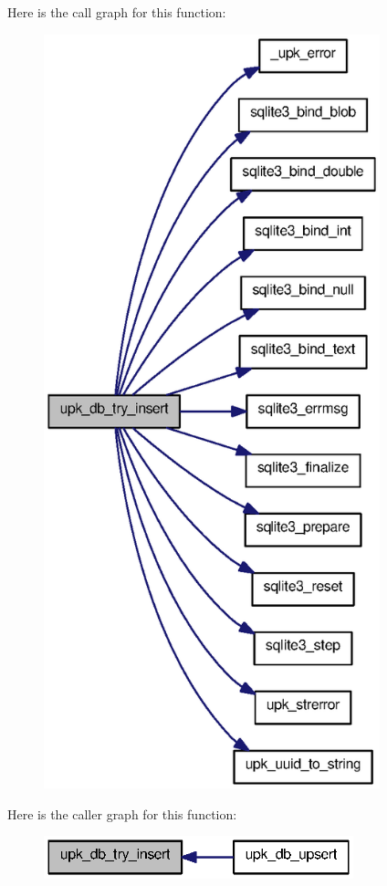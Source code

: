 Here is the call graph for this function:
\nopagebreak
\begin{figure}[H]
\begin{center}
\leavevmode
\includegraphics[width=276pt]{controller_2tp_8c_a134b3dca14e8ce64bc851612f8411458_cgraph}
\end{center}
\end{figure}




Here is the caller graph for this function:
\nopagebreak
\begin{figure}[H]
\begin{center}
\leavevmode
\includegraphics[width=254pt]{controller_2tp_8c_a134b3dca14e8ce64bc851612f8411458_icgraph}
\end{center}
\end{figure}


